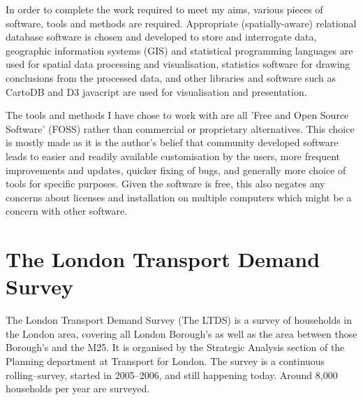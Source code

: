In order to complete the work required to meet my aims, various pieces of software, tools and methods are required. Appropriate (spatially-aware) relational database software is chosen and developed to store and interrogate data, geographic information systems (GIS) and statistical programming languages are used for spatial data processing and visualisation, statistics software for drawing conclusions from the processed data, and other libraries and software such as CartoDB and D3 javacript are used for visualisation and presentation.

The tools and methods I have chose to work with are all 'Free and Open Source Software' (FOSS) rather than commercial or proprietary alternatives. This choice is mostly made as it is the author’s belief that community developed software leads to easier and readily available customisation by the users, more frequent improvements and updates, quicker fixing of bugs, and generally more choice of tools for specific purposes. Given the software is free, this also negates any concerns about licenses and installation on multiple computers which might be a concern with other software.


\section{The London Transport Demand Survey}
\label{sec:the_ltds}

The London Transport Demand Survey (The LTDS) is a survey of households in the London area, covering all London Borough's as well as the area between those Borough's and the M25. It is organised by the Strategic Analysis section of the Planning department at Transport for London. The survey is a continuous rolling--survey, started in 2005--2006, and still happening today. Around 8,000 households per year are surveyed.

